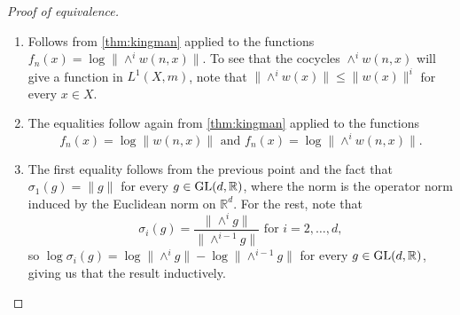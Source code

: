 \documentclass{report}
\begin{document}
\begin{proof}[Proof of equivalence]
\begin{enumerate}[label=(\roman*)]
    \item Follows from \cref{thm:kingman} applied to the functions $f_n(x) = \log \|\wedge^i w(n,x)\|$.
    To see that the cocycles $\wedge^i w(n,x)$ will give a function in $L^1(X,m)$, note that $\|\wedge^i w(x)\| \leq \|w(x)\|^i$ for every $x \in X$.
    \item The equalities follow again from \cref{thm:kingman} applied to the functions 
    \[
    f_n(x) = \log \|w(n,x)\| \text{ and }f_n(x) = \log \|\wedge^i w(n,x)\|.
    \]
    \item The first equality follows from the previous point and the fact that $\sigma_1(g) = \|g\|$ for every $g \in \operatorname{{\mathrm{GL}}}(d,\mathbb R)$, where the norm is the operator norm induced by the Euclidean norm on $\mathbb R^d$.
    For the rest, note that 
    \[
    \sigma_i(g) = \frac{\|\wedge^i g\|}{\|\wedge^{i-1} g\|} \text{ for } i = 2, \ldots, d,
    \]
    so $\log \sigma_i(g) = \log \|\wedge^i g\| - \log \|\wedge^{i-1} g\|$ for every $g \in \operatorname{{\mathrm{GL}}}(d,\mathbb R)$, giving us that the result inductively.
\end{enumerate}
\end{proof}
\end{document}

